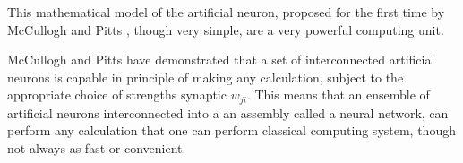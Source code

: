 This mathematical model of the artificial neuron, proposed for the first time by McCullogh and Pitts \cite {autoriFundamentali}, though very simple, are a very powerful computing unit.

McCullogh and Pitts have demonstrated that a set of interconnected artificial neurons is capable in principle of making any calculation, subject to the appropriate choice of strengths synaptic $ w_{ji} $. This means that an ensemble of artificial neurons interconnected into a an assembly called a neural network, can perform any calculation that one can perform classical computing system, though not always as fast or convenient.